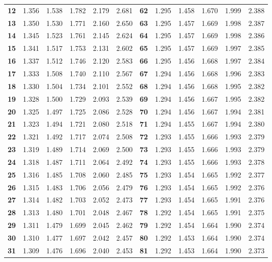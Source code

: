 \documentclass[captions=tableheading, 12pt, headings=small, parskip=half]{scrartcl}
\begin{document}
\begin{table}[ht]
{\begin{tabular}{>{\bfseries}rd{1.3}d{1.3}d{1.3}d{2.3}d{2.3}|>{\bfseries}rd{1.3}d{1.3}d{1.3}d{2.3}d{2.3}}
			12 & 1.356 & 1.538 & 1.782 & 2.179 & 2.681 & 62 & 1.295 & 1.458 & 1.670 & 1.999 & 2.388   \\ 
			13 & 1.350 & 1.530 & 1.771 & 2.160 & 2.650 & 63 & 1.295 & 1.457 & 1.669 & 1.998 & 2.387   \\ 
			14 & 1.345 & 1.523 & 1.761 & 2.145 & 2.624 & 64 & 1.295 & 1.457 & 1.669 & 1.998 & 2.386   \\ 
			15 & 1.341 & 1.517 & 1.753 & 2.131 & 2.602 & 65 & 1.295 & 1.457 & 1.669 & 1.997 & 2.385   \\ 
			16 & 1.337 & 1.512 & 1.746 & 2.120 & 2.583 & 66 & 1.295 & 1.456 & 1.668 & 1.997 & 2.384  \\ 
			17 & 1.333 & 1.508 & 1.740 & 2.110 & 2.567 & 67 & 1.294 & 1.456 & 1.668 & 1.996 & 2.383  \\ 
			18 & 1.330 & 1.504 & 1.734 & 2.101 & 2.552 & 68 & 1.294 & 1.456 & 1.668 & 1.995 & 2.382   \\ 
			19 & 1.328 & 1.500 & 1.729 & 2.093 & 2.539 & 69 & 1.294 & 1.456 & 1.667 & 1.995 & 2.382  \\ 
			20 & 1.325 & 1.497 & 1.725 & 2.086 & 2.528 & 70 & 1.294 & 1.456 & 1.667 & 1.994 & 2.381  \\ 
			21 & 1.323 & 1.494 & 1.721 & 2.080 & 2.518 & 71 & 1.294 & 1.455 & 1.667 & 1.994 & 2.380  \\ 
			22 & 1.321 & 1.492 & 1.717 & 2.074 & 2.508 & 72 & 1.293 & 1.455 & 1.666 & 1.993 & 2.379   \\ 
			23 & 1.319 & 1.489 & 1.714 & 2.069 & 2.500 & 73 & 1.293 & 1.455 & 1.666 & 1.993 & 2.379   \\ 
			24 & 1.318 & 1.487 & 1.711 & 2.064 & 2.492 & 74 & 1.293 & 1.455 & 1.666 & 1.993 & 2.378   \\ 
			25 & 1.316 & 1.485 & 1.708 & 2.060 & 2.485 & 75 & 1.293 & 1.454 & 1.665 & 1.992 & 2.377  \\ 
			26 & 1.315 & 1.483 & 1.706 & 2.056 & 2.479 & 76 & 1.293 & 1.454 & 1.665 & 1.992 & 2.376   \\ 
			27 & 1.314 & 1.482 & 1.703 & 2.052 & 2.473 & 77 & 1.293 & 1.454 & 1.665 & 1.991 & 2.376   \\ 
			28 & 1.313 & 1.480 & 1.701 & 2.048 & 2.467 & 78 & 1.292 & 1.454 & 1.665 & 1.991 & 2.375   \\ 
			29 & 1.311 & 1.479 & 1.699 & 2.045 & 2.462 & 79 & 1.292 & 1.454 & 1.664 & 1.990 & 2.374   \\ 
			30 & 1.310 & 1.477 & 1.697 & 2.042 & 2.457 & 80 & 1.292 & 1.453 & 1.664 & 1.990 & 2.374   \\ 
			31 & 1.309 & 1.476 & 1.696 & 2.040 & 2.453 & 81 & 1.292 & 1.453 & 1.664 & 1.990 & 2.373  \\ 

\end{tabular}}
\end{table}
\end{document}
